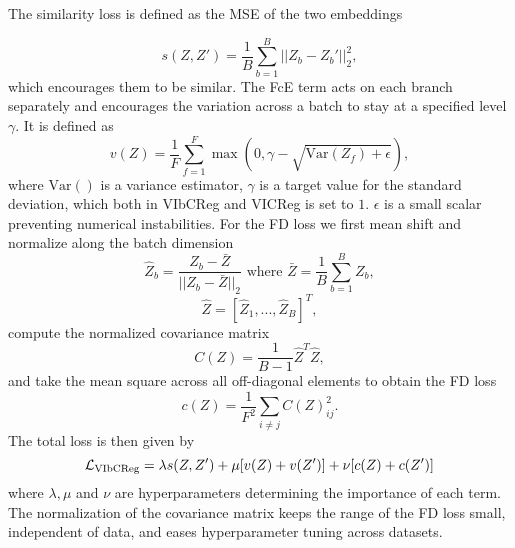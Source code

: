 \documentclass[../../thesis.tex]{subfiles}
\begin{document}
The similarity loss is defined as the MSE of the two embeddings

\begin{equation}
    s(Z,Z') = \frac{1}{B} \sum_{b=1}^B || Z_b-Z_b'||_2^2,
\end{equation}
which encourages them to be similar. The FcE term acts on each branch separately and encourages the variation across a batch to stay at a specified level $\gamma$. It is defined as 
\begin{equation}
    v(Z) =  \frac{1}{F} \sum_{f=1}^F \max(0,\gamma - \sqrt{\text{Var}(Z_f)+\epsilon}),
\end{equation}
where $\text{Var}()$ is a variance estimator, $\gamma$ is a target value for the standard deviation, which both in VIbCReg and VICReg is set to $1$. $\epsilon$ is a small scalar preventing numerical instabilities. 
\newline 
For the FD loss we first mean shift and normalize along the batch dimension
\begin{equation}
    \widehat{Z}_b = \frac{Z_b-\bar{Z}}{||Z_b-\bar{Z}||_2} \text{ where }  \bar{Z} = \frac{1}{B}\sum_{b=1}^B  Z_b,
\end{equation}
\begin{equation}
    \widehat{Z} = [\widehat{Z}_1,...,\widehat{Z}_B]^T,
\end{equation}
compute the normalized covariance matrix
\begin{equation}
    C(Z) = \frac{1}{B-1}\widehat{Z}^T \widehat{Z},
\end{equation}
and take the mean square across all off-diagonal elements to obtain the FD loss
\begin{equation}
    c(Z) = \frac{1}{F^2}\sum_{i\neq j} C(Z)_{ij}^2.
\end{equation}
The total loss is then given by
\begin{equation}
    \label{eq:VIbCRegLoss}
    \mathcal{L}_\text{VIbCReg} = \lambda s(Z,Z') + \mu [v(Z) + v(Z')] + \nu[c(Z)+c(Z')]
\end{equation}
where $\lambda, \mu$ and $\nu$ are hyperparameters determining the importance of each term. The normalization of the covariance matrix keeps the range of the FD loss small, independent of data, and eases hyperparameter tuning across datasets.
\end{document}
